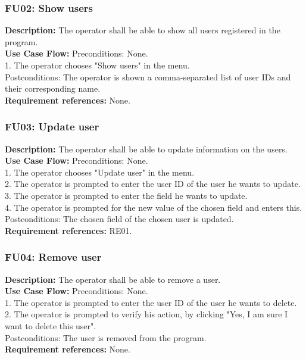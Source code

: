 \begin{adjustwidth}{2em}{0pt}
    \subsubsection*{FU02: Show users}
    \begin{adjustwidth}{1em}{0pt}
        \textbf{Description:}
        The operator shall be able to show all users registered in the program.\\
        \textbf{Use Case Flow:}
        Preconditions: None.\\
        1. The operator chooses "Show users" in the menu.\\
        Postconditions: The operator is shown a comma-separated list of user IDs and their corresponding name.\\
        \textbf{Requirement references:}
        None.
    \end{adjustwidth}
    
    \subsubsection*{FU03: Update user}
    \begin{adjustwidth}{1em}{0pt}
        \textbf{Description:}
        The operator shall be able to update information on the users.\\
        \textbf{Use Case Flow:}
        Preconditions: None.\\
        1. The operator chooses "Update user" in the menu.\\
        2. The operator is prompted to enter the user ID of the user he wants to update.\\
        3. The operator is prompted to enter the field he wants to update.\\
        4. The operator is prompted for the new value of the chosen field and enters this.\\
        Postconditions: The chosen field of the chosen user is updated.\\
        \textbf{Requirement references:}
        RE01.
    \end{adjustwidth}
    
    \subsubsection*{FU04: Remove user}
    \begin{adjustwidth}{1em}{0pt}
        \textbf{Description:}
        The operator shall be able to remove a user.\\
        \textbf{Use Case Flow:}
        Preconditions: None.\\
        1. The operator is prompted to enter the user ID of the user he wants to delete.\\
        2. The operator is prompted to verify his action, by clicking "Yes, I am sure I want to delete this user".\\
        Postconditions: The user is removed from the program.\\
        \textbf{Requirement references:}
        None.
    \end{adjustwidth}
    

\end{adjustwidth}

